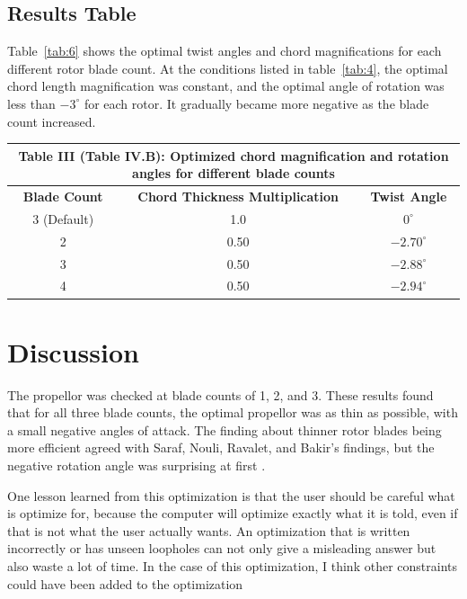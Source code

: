 \documentclass[journal ]{new-aiaa}
\begin{document}
\subsection{Results Table}

Table~\eqref{tab:6} shows the optimal twist angles and chord magnifications for each different rotor blade count. At the conditions listed in table~\eqref{tab:4}, the optimal chord length magnification was constant, and the optimal angle of rotation was less than $-3^{\circ}$ for each rotor. It gradually became more negative as the blade count increased.

\begin{center}
\begin{tabular}{| c | c | c |}
	 \multicolumn{3}{c}{Table III (Table IV.B): Optimized chord magnification and rotation angles for different blade counts}  \\ \hline
  	 \textbf{Blade Count} & \textbf{Chord Thickness Multiplication} & \textbf{Twist Angle} \\ \hline
  	 3 (Default) & 1.0 & $0^{\circ}$ \\ \hline
  	 2 & 0.50 & $-2.70^{\circ}$ \\ \hline
  	 3 & 0.50 & $-2.88^{\circ}$ \\ \hline
  	 4 & 0.50 & $-2.94^{\circ}$ \\ \hline
\end{tabular}
\label{tab:6}
\end{center}


\section{Discussion}

The propellor was checked at blade counts of 1, 2, and 3. These results found that for all three blade counts, the optimal propellor was as thin as possible, with a small negative angles of attack. The finding about thinner rotor blades being more efficient agreed with Saraf, Nouli, Ravalet, and Bakir's findings, but the negative rotation angle was surprising at first \cite{AxFlFan}.

One lesson learned from this optimization is that the user should be careful what is optimize for, because the computer will optimize exactly what it is told, even if that is not what the user actually wants. An optimization that is written incorrectly or has unseen loopholes can not only give a misleading answer but also waste a lot of time. In the case of this optimization, I think other constraints could have been added to the optimization
\end{document}
